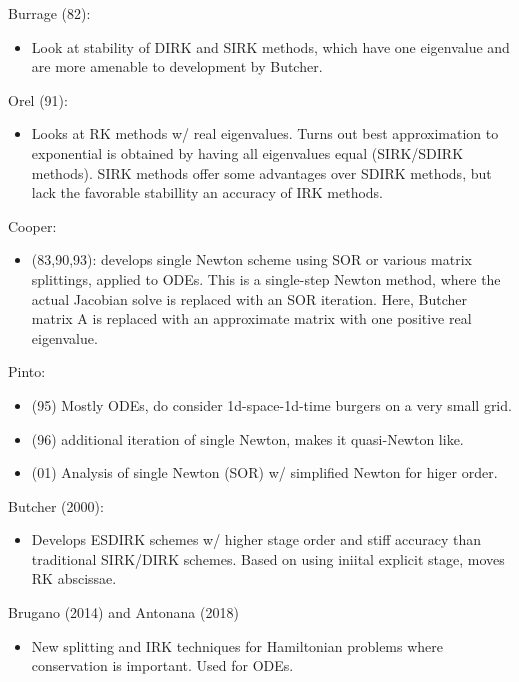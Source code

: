 \documentclass[review]{siamart}
\begin{document}
Burrage (82):
\begin{itemize}
	\item Look at stability of DIRK and SIRK methods, which have one eigenvalue and are more amenable
	to development by Butcher. 
\end{itemize}

Orel (91):
\begin{itemize}
	\item Looks at RK methods w/ real eigenvalues. Turns out best approximation to exponential is
	obtained by having all eigenvalues equal (SIRK/SDIRK methods). SIRK methods offer some advantages over SDIRK methods, but lack the favorable stabillity an accuracy of IRK methods. 
\end{itemize}

Cooper:
\begin{itemize}
	\item (83,90,93): develops single Newton scheme using SOR or various matrix splittings,
	applied to ODEs. This is a single-step
	Newton method, where the actual Jacobian solve is replaced with an SOR iteration. Here, Butcher
	matrix A is replaced with an approximate matrix with one positive real eigenvalue. 
\end{itemize}

Pinto:
\begin{itemize}
	\item (95) Mostly ODEs, do consider 1d-space-1d-time burgers on a very small grid. 
	\item (96) additional iteration of single Newton, makes it quasi-Newton like. 
	\item (01) Analysis of single Newton (SOR) w/ simplified Newton for higer order. 
\end{itemize}


Butcher (2000):
\begin{itemize}
	\item Develops ESDIRK schemes w/ higher stage order and stiff accuracy than traditional
	SIRK/DIRK schemes. Based on using iniital explicit stage, moves RK abscissae.
\end{itemize}


Brugano (2014) and Antonana (2018)
\begin{itemize}
	\item New splitting and IRK techniques for Hamiltonian problems where conservation is
	important. Used for ODEs. 
\end{itemize}


\end{document}
